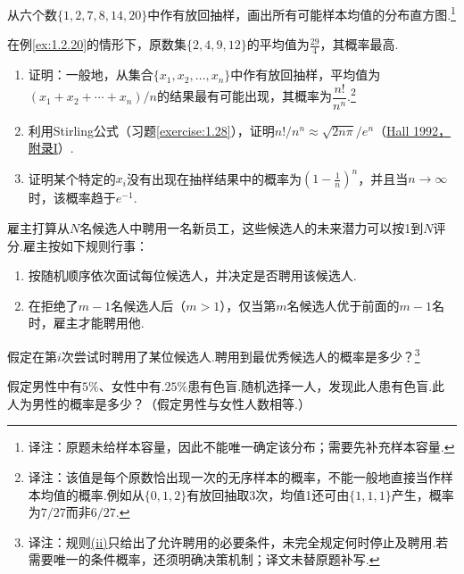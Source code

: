 \begin{exercise}\label{exercise:1.30}
从六个数$\{1,2,7,8,14,20\}$中作有放回抽样，画出所有可能样本均值的分布直方图.\footnote{译注：原题未给样本容量，因此不能唯一确定该分布；需要先补充样本容量.}
\end{exercise}

\begin{exercise}\label{exercise:1.31}
在例\ref{ex:1.2.20}的情形下，原数集$\{2,4,9,12\}$的平均值为$\frac{29}{4}$，其概率最高.
\begin{enumerate}
\item[(a)] 证明：一般地，从集合$\{x_1,x_2,\ldots,x_n\}$中作有放回抽样，平均值为$(x_1+x_2+\cdots+x_n)/n$的结果最有可能出现，其概率为$\dfrac{n!}{n^n}$.\footnote{译注：该值是每个原数恰出现一次的无序样本的概率，不能一般地直接当作样本均值的概率.例如从$\{0,1,2\}$有放回抽取3次，均值1还可由$\{1,1,1\}$产生，概率为$7/27$而非$6/27$.}
\item[(b)] 利用Stirling公式（习题\ref{exercise:1.28}），证明$n!/n^n\approx\sqrt{2n\pi}/e^n$（\hyperref[bib:source154]{Hall 1992，附录I}）.
\item[(c)] 证明某个特定的$x_i$没有出现在抽样结果中的概率为$(1-\frac1n)^n$，并且当$n\to\infty$时，该概率趋于$e^{-1}$.
\end{enumerate}
\end{exercise}

\begin{exercise}\label{exercise:1.32}
雇主打算从$N$名候选人中聘用一名新员工，这些候选人的未来潜力可以按1到$N$评分.雇主按如下规则行事：
\begin{enumerate}
\item[i.] 按随机顺序依次面试每位候选人，并决定是否聘用该候选人.
\item[ii.]\label{itm:exercise:1.32:ii} 在拒绝了$m-1$名候选人后（$m>1$），仅当第$m$名候选人优于前面的$m-1$名时，雇主才能聘用他.
\end{enumerate}
假定在第$i$次尝试时聘用了某位候选人.聘用到最优秀候选人的概率是多少？\footnote{译注：规则\hyperref[itm:exercise:1.32:ii]{(ii)}只给出了允许聘用的必要条件，未完全规定何时停止及聘用.若需要唯一的条件概率，还须明确决策机制；译文未替原题补写.}
\end{exercise}

\begin{exercise}\label{exercise:1.33}
假定男性中有$5\%$、女性中有$.25\%$患有色盲.随机选择一人，发现此人患有色盲.此人为男性的概率是多少？（假定男性与女性人数相等.）
\end{exercise}

